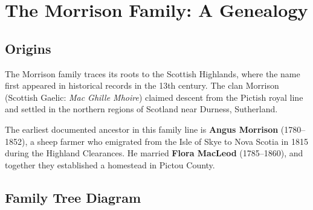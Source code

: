 \documentclass[
    language=english,
    doctype=family-tree,
    institution=none,
]{../../omnilatex}
\begin{document}
\maketitle

\section{The Morrison Family: A Genealogy}

\subsection{Origins}

The Morrison family traces its roots to the Scottish Highlands, where the name first appeared in historical records in the 13th century. The clan Morrison (Scottish Gaelic: \emph{Mac Ghille Mhoire}) claimed descent from the Pictish royal line and settled in the northern regions of Scotland near Durness, Sutherland.

The earliest documented ancestor in this family line is \textbf{Angus Morrison} (1780--1852), a sheep farmer who emigrated from the Isle of Skye to Nova Scotia in 1815 during the Highland Clearances. He married \textbf{Flora MacLeod} (1785--1860), and together they established a homestead in Pictou County.

\subsection{Family Tree Diagram}
\end{document}
